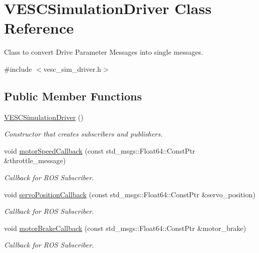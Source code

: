\hypertarget{class_v_e_s_c_simulation_driver}{}\section{V\+E\+S\+C\+Simulation\+Driver Class Reference}
\label{class_v_e_s_c_simulation_driver}


Class to convert Drive Parameter Messages into single messages.  




{\ttfamily \#include $<$vesc\+\_\+sim\+\_\+driver.\+h$>$}

\subsection*{Public Member Functions}
\begin{DoxyCompactItemize}
\item 
\hyperlink{class_v_e_s_c_simulation_driver_a49b5e654b892018b9c9eecfb7f06485a}{V\+E\+S\+C\+Simulation\+Driver} ()
\begin{DoxyCompactList}\small\item\em Constructor that creates subscribers and publishers. \end{DoxyCompactList}\item 
void \hyperlink{class_v_e_s_c_simulation_driver_a270768bae1850f87eec061ca5e828845}{motor\+Speed\+Callback} (const std\+\_\+msgs\+::\+Float64\+::\+Const\+Ptr \&throttle\+\_\+message)
\begin{DoxyCompactList}\small\item\em Callback for R\+OS Subscriber. \end{DoxyCompactList}\item 
void \hyperlink{class_v_e_s_c_simulation_driver_a79a48177b8910e181653900308eff310}{servo\+Position\+Callback} (const std\+\_\+msgs\+::\+Float64\+::\+Const\+Ptr \&servo\+\_\+position)
\begin{DoxyCompactList}\small\item\em Callback for R\+OS Subscriber. \end{DoxyCompactList}\item 
void \hyperlink{class_v_e_s_c_simulation_driver_a0eeb8ca3f5d59b55e275fd7fbc256115}{motor\+Brake\+Callback} (const std\+\_\+msgs\+::\+Float64\+::\+Const\+Ptr \&motor\+\_\+brake)
\begin{DoxyCompactList}\small\item\em Callback for R\+OS Subscriber. \end{DoxyCompactList}\end{DoxyCompactItemize}


